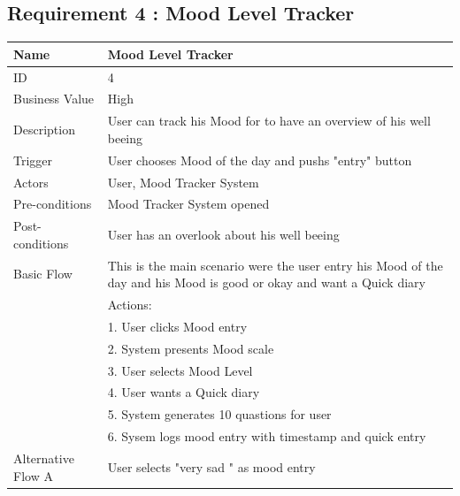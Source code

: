 \documentclass{article}
\begin{document}
\clearpage


\subsection{Requirement 4 : Mood Level Tracker}

\begin{table}[h!]
    \begin{tabularx}{\textwidth}{|>{\raggedright\arraybackslash}p{}|X|}
        \hline
        Name             & Mood Level Tracker                               \\ \hline
        ID               & 4                                                                                      \\ \hline
        Business Value   & High                                                                                   \\ \hline
        Description      & User can track his Mood for to have an overview of his well beeing  \\ \hline
        Trigger          & User chooses Mood of the day and pushs "entry" button \\ \hline
        Actors           & User, Mood Tracker System                               \\ \hline
        Pre-conditions   & Mood Tracker System opened                                   \\ \hline
        Post-conditions  & User has an overlook about his well beeing                                                       \\ \hline
        Basic Flow       & This is the main scenario were the user entry his Mood of the day and his Mood is good or okay and want a Quick diary \\ \hline
                         & Actions: \\
                         & 1. User clicks Mood entry\\
                         & 2. System presents Mood scale \\
                         & 3. User selects Mood Level \\
                         & 4. User wants a Quick diary \\
                         & 5. System generates 10 quastions for user \\
                         & 6. Sysem logs mood entry with timestamp and quick entry\\ \hline
        Alternative Flow A & User selects "very sad " as mood entry \\

\end{tabularx}
\end{table}
\end{document}
